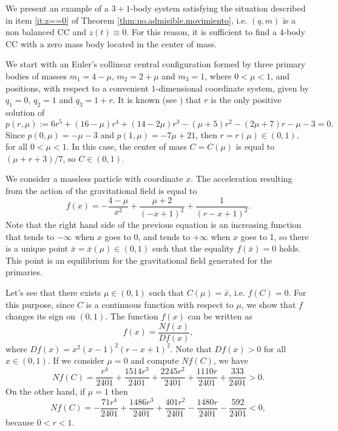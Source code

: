 \documentclass[smallcondensed]{svjour3}
\begin{document}
\begin{example}
 We present an example of a $3+1$-body system satisfying the situation described in  item \ref{it:z==0} of Theorem \ref{thm:no.admisible.movimiento}, i.e. $(q,m)$ is a non balanced CC and $z(t)\equiv 0$. For this reason, it is sufficient to find a 4-body CC with a zero mass body located in the center of mass.

 We start with an Euler's collinear central configuration formed by three primary bodies of masses $m_1 = 4-\mu$, $m_2 = 2 + \mu$ and $m_3 = 1$, where $0<\mu<1$, and positions, with respect to a convenient $1$-dimensional coordinate system,  given by $q_1 = 0$, $q_2 = 1$ and $q_3 = 1 + r$. It is known (see \cite{Moeckel:2014}) that $r$ is the only positive solution of
\[
p(r,\mu):=6 r^{5} +\left(16- \mu \right) r^{4}  +  \left( 14- 2 \mu \right) r^{3}- \left( \mu + 5\right)  r^{2}-\left( 2 \mu + 7\right) r - \mu - 3=0.
\]
Since  $p(0,\mu)=-\mu-3$ and $p(1,\mu)=-7\mu+21$, then $r=r(\mu)\in (0,1)$, for all $0<\mu<1$.
In this case, the center of mass $C=C(\mu)$ is equal to $(\mu+r+3)/7$, so $C\in (0,1)$.

We consider a massless particle with coordinate $x$. The acceleration resulting from the action of the gravitational field is equal to
\[
f(x)= - \frac{4-\mu }{x^{2}}+\frac{\mu + 2}{\left(- x + 1\right)^{2}} + \frac{1}{\left(r - x + 1\right)^{2}}.
\]
Note that the right hand side of the previous equation is an increasing function that tends to $-\infty$ when $x$ goes to 0, and tends to $+\infty$ when $x$ goes to 1, so there is a unique point $\bar{x}=\bar{x}(\mu)\in (0,1)$ such that the equality $f(\bar{x})=0$ holds. This point is an equilibrium for the gravitational field generated for the primaries.

Let's see that there exists $ \mu \in (0,1) $ such that $ C(\mu) = \bar{x} $, i.e. $f(C)=0$. For this purpose, since $C$ is a continuous function with respect to $\mu$,  we show that $f$ changes its sign on  $(0,1)$.  The function $f(x)$ can be written as $$f(x)=\frac{Nf(x)}{Df(x)},$$ where $Df(x)=x^{2} \left(x - 1\right)^{2} \left(r - x + 1\right)^{2}$. Note that  $Df(x)>0$ for all $x\in (0,1)$. If we consider $\mu=0$ and compute $Nf(C)$, we have 
\[Nf(C)=\frac{r^{4}}{2401} + \frac{1514 r^{3}}{2401} + \frac{2245 r^{2}}{2401} + \frac{1110 r}{2401} + \frac{333}{2401}>0.\]
On the other hand, if  $\mu=1$ then
\[Nf(C)=- \frac{71 r^{4}}{2401} + \frac{1486 r^{3}}{2401} + \frac{401 r^{2}}{2401} - \frac{1480 r}{2401} - \frac{592}{2401}<0,\]
because $0<r<1$.
\end{example}
\end{document}
